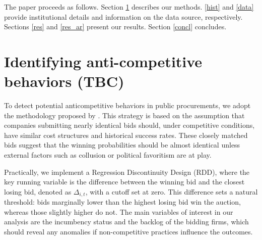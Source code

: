 \documentclass[12 pt]{elsarticle}
\begin{document}








The paper proceeds as follows. Section \ref{coll} describes our methods. \ref{hist} and \ref{data} provide institutional details and information on the data source, respectively. Sections \ref{res} and \ref{res_ar} present our results. Section \ref{concl} concludes. 

 \section{Identifying anti-competitive behaviors (TBC)}\label{coll}

To detect potential anticompetitive behaviors in public procurements, we adopt the methodology proposed by \cite{kawai2023using}. This strategy is based on the assumption that companies submitting nearly identical bids should, under competitive conditions, have similar cost structures and historical success rates. These closely matched bids suggest that the winning probabilities should be almost identical unless external factors such as collusion or political favoritism are at play.

Practically, we implement a Regression Discontinuity Design (RDD), where the key running variable is the difference between the winning bid and the closest losing bid, denoted as $\Delta_{i,t}$, with a cutoff set at zero. This difference sets a natural threshold: bids marginally lower than the highest losing bid win the auction, whereas those slightly higher do not. The main variables of interest in our analysis are the incumbency status and the backlog of the bidding firms,  which should reveal any anomalies if non-competitive practices influence the outcomes.
\end{document}
